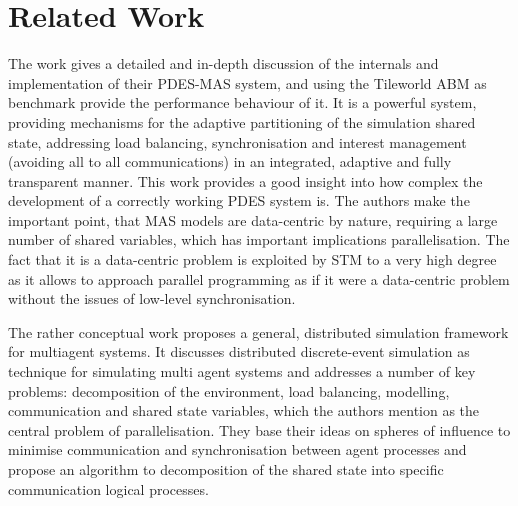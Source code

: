 \section{Related Work}
\label{sec:rel_work}

The work \cite{suryanarayanan_pdes-mas_2013} gives a detailed and in-depth discussion of the internals and implementation of their PDES-MAS system, and using the Tileworld ABM as benchmark provide the performance behaviour of it. It is a powerful system, providing mechanisms for the adaptive partitioning of the simulation shared state, addressing load balancing, synchronisation and interest management (avoiding all to all communications) in an integrated, adaptive and fully transparent manner. This work provides a good insight into how complex the development of a correctly working PDES system is. The authors make the important point, that MAS models are data-centric by nature, requiring a large number of shared variables, which has important implications parallelisation. The fact that it is a data-centric problem is exploited by STM to a very high degree as it allows to approach parallel programming as if it were a data-centric problem without the issues of low-level synchronisation.

The rather conceptual work \cite{logan_distributed_2001} proposes a general, distributed simulation framework for multiagent systems. It discusses distributed discrete-event simulation as technique for simulating multi agent systems and addresses a number of key problems: decomposition of the environment, load balancing, modelling, communication and shared state variables, which the authors mention as the central problem of parallelisation. They base their ideas on spheres of influence to minimise communication and synchronisation between agent processes and propose an algorithm to decomposition of the
shared state into specific communication logical processes.


